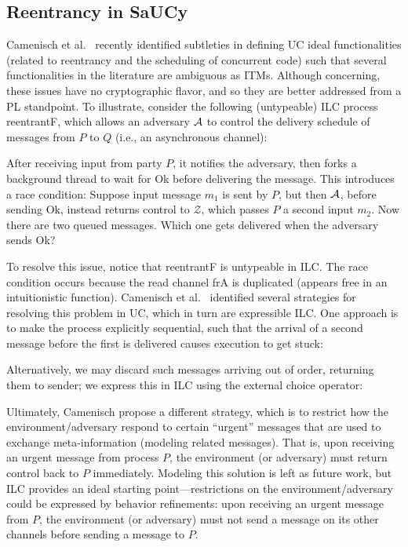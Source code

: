 \subsection{Reentrancy in SaUCy}
\label{subsec:reentrancy}

Camenisch et al.~\cite{camenisch2016universal} recently identified subtleties in
defining UC ideal functionalities (related to reentrancy and the scheduling of
concurrent code) such that several functionalities in the literature are
ambiguous as ITMs. Although concerning, these issues have no cryptographic
flavor, and so they are better addressed from a PL standpoint.  To illustrate,
consider the following (untypeable) ILC process \textsf{reentrantF}, which
allows an adversary $\mathcal{{A}}$ to control the delivery schedule of messages from
$P$ to $Q$ (i.e., an asynchronous channel):
%


After receiving input from party $P$, it notifies the adversary, then forks a
background thread to wait for \textsf{Ok} before delivering the message.  This
introduces a race condition: Suppose input message $m_1$ is sent by $P$, but
then $\mathcal{{A}}$, before sending \textsf{Ok}, instead returns control to $\mathcal
Z$, which passes $P$ a second input $m_2$. Now there are two queued
messages. Which one gets delivered when the adversary sends \textsf{Ok}?

To resolve this issue, notice that \textsf{reentrantF} is untypeable in ILC.
The race condition occurs because the read channel \textsf{frA} is duplicated
(appears free in an intuitionistic function).  Camenisch et
al.~\cite{camenisch2016universal} identified several strategies for resolving
this problem in UC, which in turn are expressible ILC. One approach is to make
the process explicitly sequential, such that the arrival of a second message
before the first is delivered causes execution to get stuck:

Alternatively, we may discard such messages arriving out of order, returning
them to sender; we express this in ILC using the external choice operator:


Ultimately, Camenisch \etal propose a different strategy, which is to restrict
how the environment/adversary respond to certain ``urgent'' messages that are
used to exchange meta-information (modeling related messages). That is, upon
receiving an urgent message from process $P$, the environment (or adversary)
must return control back to $P$ immediately. Modeling this solution is left as
future work, but ILC provides an ideal starting point---restrictions on the
environment/adversary could be expressed by behavior refinements: upon receiving
an urgent message from $P$, the environment (or adversary) must not send a
message on its other channels before sending a message to $P$.
